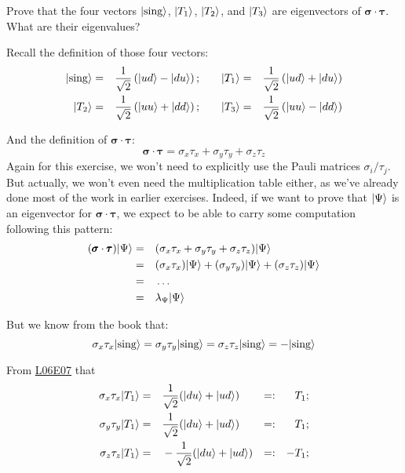 \documentclass[solutions.tex]{subfiles}
\begin{document}
\maketitle
\begin{exercise} Prove that the four vectors $|\text{sing}\rangle$,
$|T_1\rangle$, $|T_2\rangle$, and $|T_3\rangle$ are eigenvectors of
$\bm{\sigma}\cdot\bm{\tau}$. What are their eigenvalues?
\end{exercise}
Recall the definition of those four vectors:
\begin{equation*}\begin{aligned}
	|\text{sing}\rangle &=&& \frac1{\sqrt2}\left(|ud\rangle-|du\rangle\right); &&&
	|T_1\rangle &=&& \frac1{\sqrt2}\left(|ud\rangle+|du\rangle\right) \\
	|T_2\rangle &=&& \frac1{\sqrt2}\left(|uu\rangle+|dd\rangle\right); &&&
	|T_3\rangle &=&& \frac1{\sqrt2}\left(|uu\rangle-|dd\rangle\right)
\end{aligned}\end{equation*}

And the definition of $\bm{\sigma}\cdot\bm{\tau}$:
\[
	\bm{\sigma}\cdot\bm{\tau} = \sigma_x\tau_x + \sigma_y\tau_y + \sigma_z\tau_z
\]
Again for this exercise, we won't need to explicitly use the
Pauli matrices $\sigma_i / \tau_j $. But actually, we won't even need
the multiplication table either, as we've already done most of the work
in earlier exercises. Indeed, if we want to prove that $|\Psi\rangle$ is
an eigenvector for $\bm{\sigma}\cdot\bm{\tau}$, we expect to be able to
carry some computation following this pattern:
\begin{equation*}\begin{aligned}
	(\pmb{\sigma}\cdot\pmb{\tau})|\Psi\rangle &=&&
		(\sigma_x\tau_x + \sigma_y\tau_y + \sigma_z\tau_z)|\Psi\rangle \\
	~ &=&& (\sigma_x\tau_x)|\Psi\rangle + (\sigma_y\tau_y)|\Psi\rangle +
		(\sigma_z\tau_z)|\Psi\rangle \\
	~ &=&& \ldots \\
	~ &=&& \lambda_\Psi|\Psi\rangle \\
\end{aligned}\end{equation*}

But we know from the book that:
\[
	\sigma_x\tau_x|\text{sing}\rangle =
	\sigma_y\tau_y|\text{sing}\rangle =
	\sigma_z\tau_z|\text{sing}\rangle = -|\text{sing}\rangle
\]

From
\href{https://github.com/mbivert/ttm/blob/master/qm/L06E07.pdf}{L06E07} that
\begin{equation*}\begin{aligned}
	\sigma_x\tau_x|T_1\rangle &=&& \frac1{\sqrt2}(|du\rangle+|ud\rangle) &=:&& T_1;\\
	\sigma_y\tau_y|T_1\rangle &=&& \frac1{\sqrt2}(|du\rangle+|ud\rangle) &=:&& T_1;\\
	\sigma_z\tau_z|T_1\rangle &=&& -\frac1{\sqrt2}(|du\rangle+|ud\rangle) &=:&& -T_1;\\
\end{aligned}\end{equation*}
\end{document}
